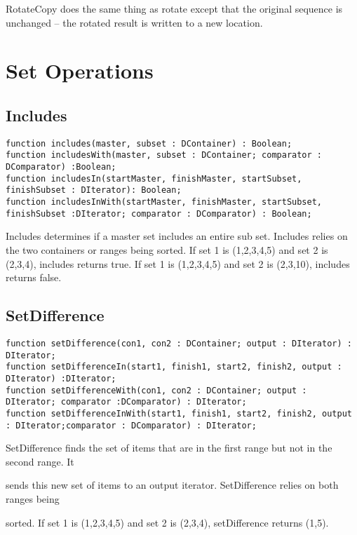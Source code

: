 \documentclass{report}
\begin{document}
RotateCopy does the same thing as rotate except that the original sequence
is unchanged -- the rotated result is written to a new location.

\section{Set Operations}

\subsection{Includes}

\begin{lstlisting}
function includes(master, subset : DContainer) : Boolean;
function includesWith(master, subset : DContainer; comparator : DComparator) :Boolean;
function includesIn(startMaster, finishMaster, startSubset, finishSubset : DIterator): Boolean;
function includesInWith(startMaster, finishMaster, startSubset, finishSubset :DIterator; comparator : DComparator) : Boolean;
\end{lstlisting}

Includes determines if a master set includes an entire sub set. Includes
relies on the two containers or ranges being sorted. If set 1 is (1,2,3,4,5)
and set 2 is (2,3,4), includes returns true. If set 1 is (1,2,3,4,5) and set
2 is (2,3,10), includes returns false.

\subsection{SetDifference}

\begin{lstlisting}
function setDifference(con1, con2 : DContainer; output : DIterator) : DIterator;
function setDifferenceIn(start1, finish1, start2, finish2, output : DIterator) :DIterator;
function setDifferenceWith(con1, con2 : DContainer; output : DIterator; comparator :DComparator) : DIterator;
function setDifferenceInWith(start1, finish1, start2, finish2, output : DIterator;comparator : DComparator) : DIterator;
\end{lstlisting}

SetDifference finds the set of items that are in the 
first range but not in the second range. It

sends this new set of items to an output iterator. SetDifference 
relies on both ranges being

sorted. If set 1 is (1,2,3,4,5) and set 2 is (2,3,4), setDifference 
returns (1,5).
\end{document}

